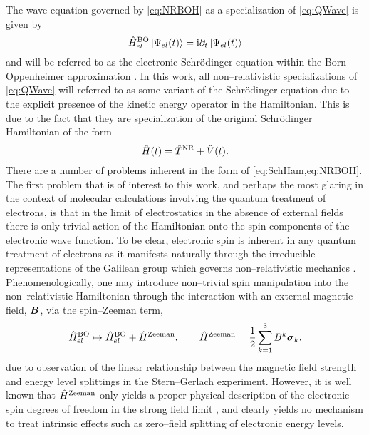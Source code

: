 The wave equation governed by \cref{eq:NRBOH} as a specialization of \cref{eq:QWave} is given by
\begin{equation}
\label{eq:NRSCH}
\hat{H}^{\mathrm{BO}}_{el} \left\vert \Psi_{el} (t) \right\rangle = \mathrm i \partial_t \left\vert \Psi_{el} (t) \right\rangle
\end{equation}
and will be referred to as the electronic Schr\"{o}dinger equation within the Born--Oppenheimer approximation \cite{Tully98_407}.
In this work, all non--relativistic specializations of \cref{eq:QWave} will referred to as some variant of the Schr\"{o}dinger
equation due to the explicit presence of the kinetic energy operator in the Hamiltonian. This is due to the fact that they
are specialization of the original Schr\"{o}dinger Hamiltonian of the form
\begin{equation}
\label{eq:SchHam}
\hat{H}(t) = \hat{T}^{\mathrm{NR}} + \hat{V}(t).
\end{equation}
There are a number of problems inherent in the form of \cref{eq:SchHam,eq:NRBOH}. The first problem that is of interest to this work,
and perhaps the most glaring in the context of molecular calculations involving the quantum treatment of electrons,
is that in the limit of electrostatics in the absence of external fields there is only trivial action of the
Hamiltonian onto the spin components of the electronic  wave function. To be clear, electronic spin is inherent in any quantum
treatment of electrons as it manifests naturally through the irreducible representations of the Galilean group
which governs non--relativistic mechanics \cite{Levy67_286}.  Phenomenologically, one may introduce non--trivial spin manipulation into the non--relativistic
Hamiltonian through the interaction with an external magnetic field, $\boldsymbol{B}$, via the spin--Zeeman term,
\begin{equation}
\hat{H}^{\mathrm{BO}}_{el} \mapsto  \hat{H}^{\mathrm{BO}}_{el} + \hat{H}^\mathrm{Zeeman}, \qquad \hat{H}^\mathrm{Zeeman}  = \frac{1}{2} \sum_{k=1}^3 B^k \boldsymbol{\sigma}_{k},
\end{equation}
due to observation of the linear relationship between the magnetic field strength and energy level splittings in the Stern--Gerlach 
experiment\cite{Napolitano17_book}. However, it is well known that $\hat{H}^\mathrm{Zeeman}$ only yields a proper physical description
of the electronic spin degrees of freedom in the strong field limit , and clearly yields no mechanism to treat
intrinsic effects such as zero--field splitting of electronic energy levels.

